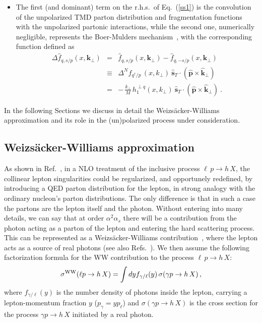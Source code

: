 \documentclass[nofootinbib,superscriptaddress,aps]{revtex4}
\newcommand{\be}{\begin{equation}}
\newcommand{\ee}{\end{equation}}
\newcommand{\bea}{\begin{eqnarray}}
\newcommand{\eea}{\end{eqnarray}}
\begin{document}
\begin{itemize}
\item
The first (and dominant) term on the r.h.s.~of  Eq.~(\ref{ss1}) is the convolution of the unpolarized TMD parton distribution and fragmentation functions with the unpolarized partonic interactions, while the second one, numerically negligible, represents the Boer-Mulders mechanism~\cite{Boer:1997nt,Boer:1999mm}, with the corresponding function defined as
%
\bea
\Delta \hat f_{q,s/p}(x, \bm{k}_{\perp}) &=& \hat f_{q,s/p}(x,\bm{k}_{\perp}) - \hat f_{q,-s/p}(x, \bm{k}_{\perp}) \nonumber\\
&\equiv& \Delta^N\! f_{q^\uparrow/p}\,(x, k_{\perp}) \> \hat{\bm{s}}_T \cdot (\hat{\bm{p}} \times \hat{\bm{k}}_{\perp }) \nonumber       \\
\label{defboernoi}
&=& -\, \frac{k_\perp}{M} \, h_{1}^{\perp q}(x, k_{\perp}) \>
\hat{\bm{s}}_T \cdot (\hat{\bm{p}} \times \hat{\bm{k}}_{\perp }) \>.
%
\eea
\end{itemize}

In the following Sections we discuss in detail the Weizs\"acker-Williams approximation and its role in the (un)polarized process under consideration.

\subsection{Weizs\"acker-Williams approximation}

As shown in Ref.~\cite{Hinderer:2015hra}, in a NLO treatment of the inclusive process $\ell\, p\to h\,X$, the collinear lepton singularities could be regularized, and opportunely redefined, by introducing a QED parton distribution for the lepton, in strong analogy with the ordinary nucleon's parton distributions. The only difference is that in such a case the partons are the lepton itself and the photon. Without entering into many details, we can say that at order $\alpha^2\alpha_s$ there will be a contribution from the photon acting as a parton of the lepton and entering the hard scattering process. This can be represented as a Weizs\"acker-Williams contribution~\cite{vonWeizsacker:1934nji,Williams:1934ad}, where the lepton acts as a source of real photons (see also Refs.~\cite{Brodsky:1971ud,Terazawa:1973tb,Kniehl:1990iv}). We then assume the following factorization formula for the WW contribution to the process $\ell\, p \to h\, X$:
\be
\label{WW}
\sigma^{\rm WW}(\ell p \to h\, X) = \int d y f_{\gamma/\ell}(y)\, \sigma(\gamma p\to h\, X) \,,
\ee
where $f_{\gamma/\ell}(y)$ is the number density of photons inside the lepton, carrying a lepton-momentum fraction $y$ ($p_\gamma = y p_\ell$) and $\sigma(\gamma p\to h \,X)$ is the cross section for the process $\gamma p\to h \,X$ initiated by a real photon.
\end{document}

